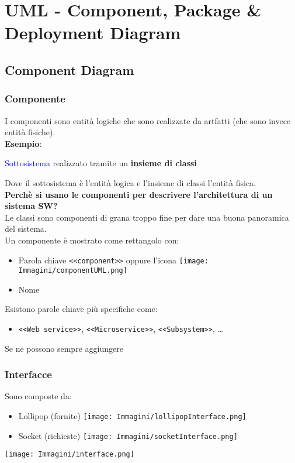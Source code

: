 \documentclass[12pt, a4paper]{report}
\begin{document}
\chapter{UML - Component, Package \& Deployment Diagram}
\section{Component Diagram}
\subsection{Componente}
I componenti sono entità logiche che sono realizzate da artfatti (che sono invece entità fisiche).\\
\textbf{Esempio}:
\begin{center}
    \textcolor{blue}{Sottosistema} realizzato tramite un \textbf{insieme di classi}
\end{center}
Dove il sottosistema è l'entità logica e l'insieme di classi l'entità fisica.\\
\textbf{Perchè si usano le componenti per descrivere l'architettura di un sistema SW?}\\
    Le classi sono componenti di grana troppo fine per dare una buona panoramica del sistema.\\
Un componente è mostrato come rettangolo con:
\begin{itemize}
    \item Parola chiave \texttt{<<component>>} oppure l'icona \texttt{[image: Immagini/componentUML.png]}
    \item Nome
\end{itemize}
Esistono parole chiave più specifiche come:
\begin{itemize}
    \item \texttt{<<Web service>>}, \texttt{<<Microservice>>}, \texttt{<<Subsystem>>}, \dots
\end{itemize}
Se ne possono sempre aggiungere
\subsection{Interfacce}
\begin{minipage}
    {.4\textwidth}
    Sono composte da:
    \begin{itemize}
        \item Lollipop (fornite) \texttt{[image: Immagini/lollipopInterface.png]}
        \item Socket (richieste) \texttt{[image: Immagini/socketInterface.png]}
    \end{itemize}
\end{minipage}
\begin{minipage}
    {.5\textwidth}
    \begin{center}
        \texttt{[image: Immagini/interface.png]}
    \end{center}
\end{minipage}
\end{document}
